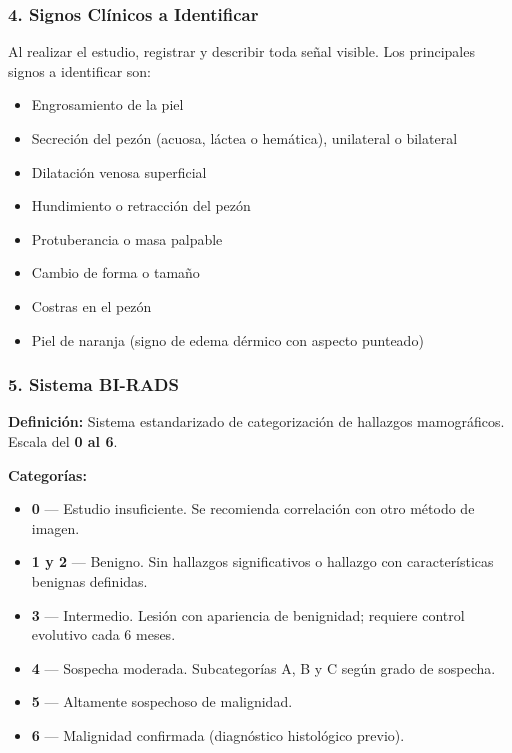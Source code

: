 	\subsubsection*{4. Signos Clínicos a Identificar}
	
	Al realizar el estudio, registrar y describir toda señal visible. Los principales signos a identificar son:
	
	\begin{itemize}
		\item Engrosamiento de la piel
		\item Secreción del pezón (acuosa, láctea o hemática), unilateral o bilateral
		\item Dilatación venosa superficial
		\item Hundimiento o retracción del pezón
		\item Protuberancia o masa palpable
		\item Cambio de forma o tamaño
		\item Costras en el pezón
		\item Piel de naranja (signo de edema dérmico con aspecto punteado)
	\end{itemize}
	

	
	\subsubsection*{5. Sistema BI-RADS}
	
	\textbf{Definición:} Sistema estandarizado de categorización de hallazgos mamográficos. Escala del \textbf{0 al 6}.
	
	\textbf{Categorías:}
	
	\begin{itemize}
		\item \textbf{0} — Estudio insuficiente. Se recomienda correlación con otro método de imagen.
		\item \textbf{1 y 2} — Benigno. Sin hallazgos significativos o hallazgo con características benignas definidas.
		\item \textbf{3} — Intermedio. Lesión con apariencia de benignidad; requiere control evolutivo cada 6 meses.
		\item \textbf{4} — Sospecha moderada. Subcategorías A, B y C según grado de sospecha.
		\item \textbf{5} — Altamente sospechoso de malignidad.
		\item \textbf{6} — Malignidad confirmada (diagnóstico histológico previo).
	\end{itemize}
	
